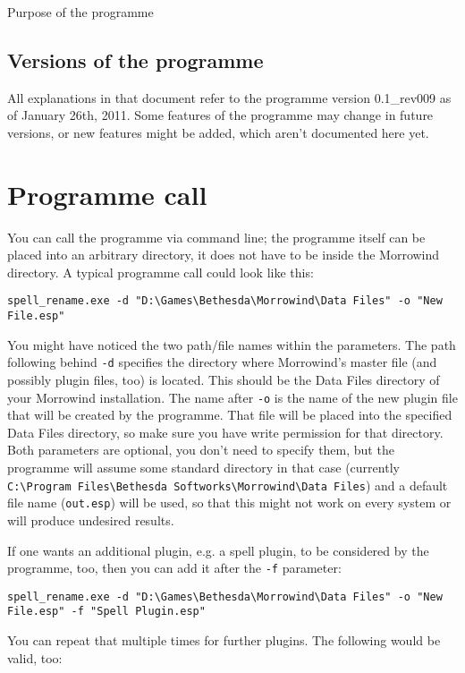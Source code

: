 \documentclass[12pt,oneside,a4paper]{article}
\begin{document}
\begin{section}{Purpose of the programme}
\subsection{Versions of the programme}
All explanations in that document refer to the programme version 0.1\_rev009 as
of January 26th, 2011. Some features of the programme may change in future
versions, or new features might be added, which aren't documented here yet.
\end{section}

\section{Programme call}
You can call the programme via command line; the programme itself can be placed
into an arbitrary directory, it does not have to be inside the Morrowind
directory. A typical programme call could look like this:

\texttt{spell\_rename.exe -d "D:\textbackslash{}Games\textbackslash{}Bethesda\textbackslash{}Morrowind\textbackslash{}Data Files" -o "New File.esp"}

You might have noticed the two path\slash file names within the parameters.
The path following behind \texttt{-d} specifies the directory where Morrowind's
master file (and possibly plugin files, too) is located. This should be the
Data Files directory of your Morrowind installation.
The name after \texttt{-o} is the name of the new plugin file that will be
created by the programme. That file will be placed into the specified Data
Files directory, so make sure you have write permission for that directory.
Both parameters are optional, you don't need to specify them, but the programme
will assume some standard directory in that case (currently \texttt{C:\textbackslash{}Program Files\textbackslash{}Bethesda Softworks\textbackslash{}Morrowind\textbackslash{}Data Files})
and a default file name (\texttt{out.esp}) will be used, so that this might not
work on every system or will produce undesired results.

If one wants an additional plugin, e.g. a spell plugin, to be considered by the
programme, too, then you can add it after the \texttt{-f} parameter:

\texttt{spell\_rename.exe -d "D:\textbackslash{}Games\textbackslash{}Bethesda\textbackslash{}Morrowind\textbackslash{}Data Files" -o "New File.esp" -f "Spell Plugin.esp"}

You can repeat that multiple times for further plugins.
The following would be valid, too:
\end{document}
